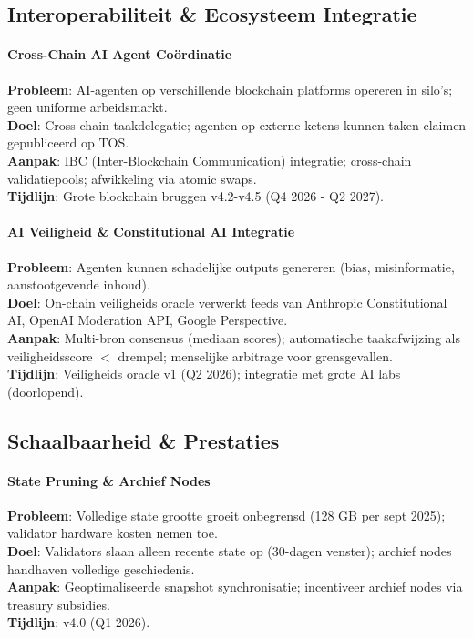 \documentclass[11pt]{article}
\begin{document}
\subsection{Interoperabiliteit \& Ecosysteem Integratie}

\paragraph{Cross-Chain AI Agent Coördinatie}
\textbf{Probleem}: AI-agenten op verschillende blockchain platforms opereren in silo's; geen uniforme arbeidsmarkt.\\
\textbf{Doel}: Cross-chain taakdelegatie; agenten op externe ketens kunnen taken claimen gepubliceerd op TOS.\\
\textbf{Aanpak}: IBC (Inter-Blockchain Communication) integratie; cross-chain validatiepools; afwikkeling via atomic swaps.\\
\textbf{Tijdlijn}: Grote blockchain bruggen v4.2-v4.5 (Q4 2026 - Q2 2027).

\paragraph{AI Veiligheid \& Constitutional AI Integratie}
\textbf{Probleem}: Agenten kunnen schadelijke outputs genereren (bias, misinformatie, aanstootgevende inhoud).\\
\textbf{Doel}: On-chain veiligheids oracle verwerkt feeds van Anthropic Constitutional AI, OpenAI Moderation API, Google Perspective.\\
\textbf{Aanpak}: Multi-bron consensus (mediaan scores); automatische taakafwijzing als veiligheidsscore $<$ drempel; menselijke arbitrage voor grensgevallen.\\
\textbf{Tijdlijn}: Veiligheids oracle v1 (Q2 2026); integratie met grote AI labs (doorlopend).

\subsection{Schaalbaarheid \& Prestaties}

\paragraph{State Pruning \& Archief Nodes}
\textbf{Probleem}: Volledige state grootte groeit onbegrensd (128 GB per sept 2025); validator hardware kosten nemen toe.\\
\textbf{Doel}: Validators slaan alleen recente state op (30-dagen venster); archief nodes handhaven volledige geschiedenis.\\
\textbf{Aanpak}: Geoptimaliseerde snapshot synchronisatie; incentiveer archief nodes via treasury subsidies.\\
\textbf{Tijdlijn}: v4.0 (Q1 2026).
\end{document}
